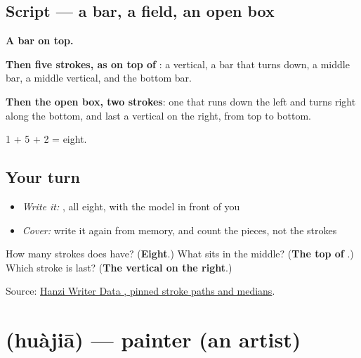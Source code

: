 \subsection*{Script — a bar, a field, an open box}

\begin{quote}
\end{quote}

\textbf{A bar on top.}

\textbf{Then five strokes, as on top of }: a vertical, a bar that turns down, a middle bar, a middle vertical, and the bottom bar.

\textbf{Then the open box, two strokes}: one that runs down the left and turns right along the bottom, and last a vertical on the right, from top to bottom.

1 + 5 + 2 = eight.

\subsection*{Your turn}
\begin{itemize}
\raggedright
  \item \emph{Write it:} , all eight, with the model in front of you
  \item \emph{Cover:} write it again from memory, and count the pieces, not the strokes
\end{itemize}

\begin{tcolorbox}[breakable,colback=teal!4,colframe=teal!35!black,title={Before you move on}]
How many strokes does  have? (\textbf{Eight}.) What sits in the middle? (\textbf{The top of }.) Which stroke is last? (\textbf{The vertical on the right}.)

Source: \href{https://raw.githubusercontent.com/chanind/hanzi-writer-data/68d10a4b21150cae5e1ebbd223eed289cf32d90c/data/\%E7\%94\%BB.json}{Hanzi Writer Data , pinned stroke paths and medians}.
\end{tcolorbox}
\section[\texorpdfstring{\zh{画家} (huàjiā)}{画家 (huàjiā)}]{ (huàjiā) — painter (an artist)}

\label{lesson:ZH-C502-huajia}



